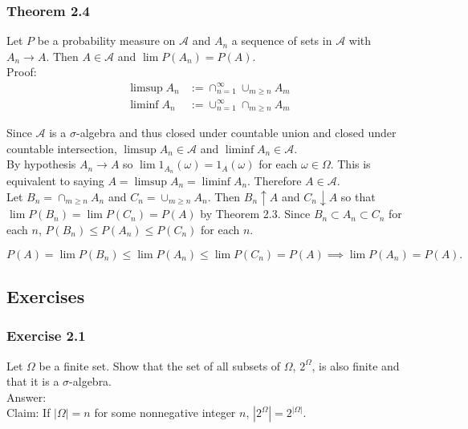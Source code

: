 \documentclass{article}
\begin{document}
\subsubsection*{Theorem 2.4} Let $P$ be a probability measure on $\mathcal{A}$ and $A_n$ a sequence of sets in $\mathcal{A}$ with $A_n \rightarrow A$. Then $A \in \mathcal{A}$ and $\lim P(A_n) = P(A)$. \\

Proof: 
\begin{align*}
\limsup A_n &:= \cap_{n=1}^\infty \cup_{m \geq n} A_m \\
\liminf A_n &:= \cup_{n=1}^\infty \cap_{m\geq n} A_m
\end{align*}

Since $\mathcal{A}$ is a $\sigma$-algebra and thus closed under countable union and closed under countable intersection, $\limsup A_n \in \mathcal{A}$ and $\liminf A_n \in \mathcal{A}$.\\

By hypothesis $A_n \rightarrow A$ so $\lim 1_{A_n}(\omega) = 1_{A}(\omega)$ for each $\omega \in \Omega$. This is equivalent to saying $A = \limsup A_n = \liminf A_n$. Therefore $A \in \mathcal{A}$.\\

Let $B_n = \cap_{m \geq n} A_n$ and $C_n = \cup_{m\geq n} A_n$. Then $B_n \uparrow A$ and $C_n \downarrow A$ so that $\lim P(B_n) = \lim P(C_n) = P(A)$ by Theorem 2.3. Since $B_n \subset A_n \subset C_n$ for each $n$, $P(B_n) \leq P(A_n) \leq P(C_n)$ for each $n$. 

$$
P(A) = \lim P(B_n) \leq \lim P(A_n) \leq \lim P(C_n) = P(A) \implies \lim P(A_n) = P(A).
$$

\subsection*{Exercises}

\subsubsection*{Exercise 2.1}

Let $\Omega$ be a finite set. Show that the set of all subsets of $\Omega$, $2^\Omega$, is also
finite and that it is a $\sigma$-algebra.\\

Answer:\\

Claim: If $|\Omega| = n$ for some nonnegative integer $n$, $|2^\Omega| = 2^{|\Omega|}$.\\
\end{document}
